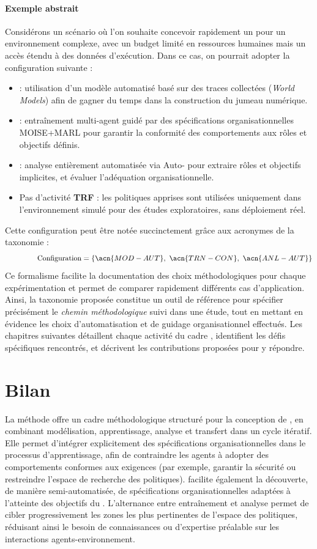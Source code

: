 \paragraph{Exemple abstrait}
Considérons un scénario où l'on souhaite concevoir rapidement un  pour un environnement complexe, avec un budget limité en ressources humaines mais un accès étendu à des données d'exécution.
Dans ce cas, on pourrait adopter la configuration suivante :
\begin{itemize}
  \item {} : utilisation d'un modèle automatisé basé sur des traces collectées (\textit{World Models}) afin de gagner du temps dans la construction du jumeau numérique.
  \item {} : entraînement multi-agent guidé par des spécifications organisationnelles MOISE+MARL pour garantir la conformité des comportements aux rôles et objectifs définis.
  \item {} : analyse entièrement automatisée via Auto- pour extraire rôles et objectifs implicites, et évaluer l'adéquation organisationnelle.
  \item Pas d'activité \textbf{TRF} : les politiques apprises sont utilisées uniquement dans l'environnement simulé pour des études exploratoires, sans déploiement réel.
\end{itemize}

Cette configuration peut être notée succinctement grâce aux acronymes de la taxonomie :
\[
  \hspace{1.5cm}\text{Configuration} = \{\acn{MOD-AUT},\ \acn{TRN-CON},\ \acn{ANL-AUT}\}
\]
Ce formalisme facilite la documentation des choix méthodologiques pour chaque expérimentation et permet de comparer rapidement différents cas d'application.
%
Ainsi, la taxonomie proposée constitue un outil de référence pour spécifier précisément le \textit{chemin méthodologique} suivi dans une étude, tout en mettant en évidence les choix d'automatisation et de guidage organisationnel effectués.
Les chapitres suivantes détaillent chaque activité du cadre , identifient les défis spécifiques rencontrés, et décrivent les contributions proposées pour y répondre.

\section{Bilan}
La méthode  offre un cadre méthodologique structuré pour la conception de , en combinant modélisation, apprentissage, analyse et transfert dans un cycle itératif. Elle permet d'intégrer explicitement des spécifications organisationnelles dans le processus d'apprentissage, afin de contraindre les agents à adopter des comportements conformes aux exigences (par exemple, garantir la sécurité ou restreindre l'espace de recherche des politiques).  facilite également la découverte, de manière semi-automatisée, de spécifications organisationnelles adaptées à l'atteinte des objectifs du . L'alternance entre entraînement et analyse permet de cibler progressivement les zones les plus pertinentes de l'espace des politiques, réduisant ainsi le besoin de connaissances ou d'expertise préalable sur les interactions agents-environnement.

